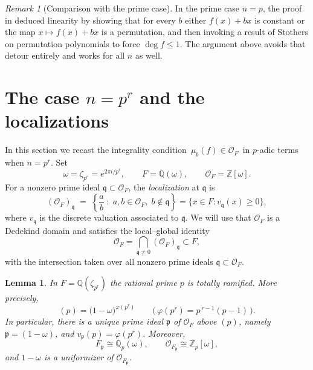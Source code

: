 \documentclass[11pt]{amsart}
\newtheorem{lemma}[thm]{Lemma}
\theoremstyle{definition}
\theoremstyle{remark}
\newtheorem{rem}[thm]{Remark}
\numberwithin{equation}{section}
\begin{document}
\begin{rem}[Comparison with the prime case]
	In the prime case $n=p$, the proof in \cite[Theorem 7]{panraksa2017note} deduced linearity by showing that for every $b$ either $f(x)+bx$ is constant or the map $x\mapsto f(x)+bx$ is a permutation, and then invoking a result of Stothers on permutation polynomials to force $\deg f\le1$. The argument above avoids that detour entirely and works for all $n$ as well. %
\end{rem}

\section{The case \texorpdfstring{$n=p^r$}{n=p to the r} and the localizations}
\label{sec:localization}

In this section we recast the integrality condition $\,\mu_b(f)\in \mathcal{O}_F\,$ in $p$-adic
terms when $n=p^r$. Set
\[
	\omega=\zeta_{p^r}=e^{2\pi i/p^r},\qquad F=\mathbb{Q}(\omega),\qquad \mathcal{O}_F=\mathbb{Z}[\omega].
\]
For a nonzero prime ideal $\mathfrak{q}\subset \mathcal{O}_F$, the \emph{localization} at $\mathfrak{q}$ is
\[
	(\mathcal{O}_F)_{\mathfrak{q}} \;=\; \left\{\frac{a}{b}\;:\; a,b\in \mathcal{O}_F,\; b\notin \mathfrak{q}\right\} = \{x\in F: v_{\mathfrak{q}}(x)\ge 0\},
\]
where $v_{\mathfrak{q}}$ is the discrete valuation associated to $\mathfrak{q}$. We will
use that $\mathcal{O}_F$ is a Dedekind domain and satisfies the local--global identity
\begin{equation}\label{eq:lg}
	\mathcal{O}_F=\bigcap_{\mathfrak{q}\ne 0}(\mathcal{O}_F)_{\mathfrak{q}}\subset F,
\end{equation}
with the intersection taken over all nonzero prime ideals $\mathfrak{q}\subset \mathcal{O}_F$.

\begin{lemma}\label{lem:total-ram}
	In $F=\mathbb{Q}(\zeta_{p^r})$ the rational prime $p$ is totally ramified. More precisely,
	\[
		(p)=\bigl(1-\omega\bigr)^{\varphi(p^r)}\qquad\bigl(\,\varphi(p^r)=p^{\,r-1}(p-1)\,\bigr).
	\]
	In particular, there is a unique prime ideal $\mathfrak{p}$ of $\mathcal{O}_F$ above $(p)$, namely
	$\mathfrak{p}=(1-\omega)$, and $v_{\mathfrak{p}}(p)=\varphi(p^r)$. Moreover,
	\[
		F_{\mathfrak{p}}\cong \mathbb{Q}_p(\omega),\qquad \mathcal{O}_{F_{\mathfrak{p}}}\cong \mathbb{Z}_p[\omega],
	\]
	and $1-\omega$ is a uniformizer of $\mathcal{O}_{F_{\mathfrak{p}}}$.
\end{lemma}
\end{document}
